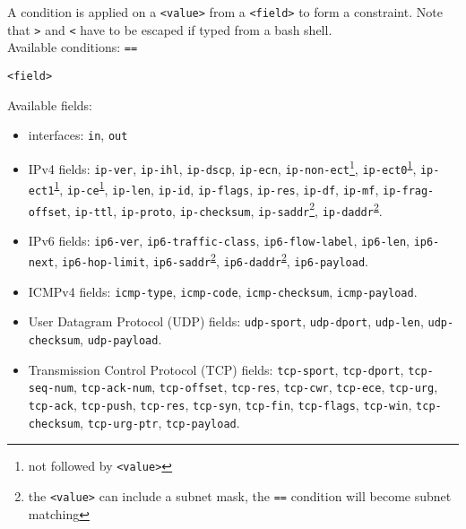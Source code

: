 \documentclass[a4paper,twoside,11pt]{report}
\makeatletter
\renewcommand{\subsection}{\@startsection{subsection}{2}{0mm}
  {\baselineskip}%
  {\baselineskip}{\Large\color{black}}}%
\makeatother
\begin{document}
A condition is applied on a \texttt{<value>} from a \texttt{<field>} to form
a constraint. Note that \texttt{>} and \texttt{<} have to be escaped if typed
from a bash shell.\\ 
Available conditions: \texttt{==}%

\subsection{\texttt{<field>}}

Available fields:
   \begin{itemize}
   \item interfaces: \texttt{in}, \texttt{out}

   \item IPv4 fields: \texttt{ip-ver}, \texttt{ip-ihl},  \texttt{ip-dscp}, 
     \texttt{ip-ecn}, \texttt{ip-non-ect}\footnote{\label{note-ecn}not followed 
     by \texttt{<value>}}, \texttt{ip-ect0}\textsuperscript{\ref{note-ecn}},
     \texttt{ip-ect1}\textsuperscript{\ref{note-ecn}}, 
     \texttt{ip-ce}\textsuperscript{\ref{note-ecn}}, \texttt{ip-len}, 
     \texttt{ip-id}, \texttt{ip-flags}, \texttt{ip-res}, \texttt{ip-df}, 
     \texttt{ip-mf}, \texttt{ip-frag-offset}, \texttt{ip-ttl}, \texttt{ip-proto}, 
     \texttt{ip-checksum}, \texttt{ip-saddr}\footnote{\label{note-prefix} the \texttt{<value>} 
     can include a subnet mask, the \texttt{==} condition will become subnet matching}, 
     \texttt{ip-daddr}\textsuperscript{\ref{note-prefix}}.

   \item IPv6 fields: \texttt{ip6-ver}, \texttt{ip6-traffic-class}, 
      \texttt{ip6-flow-label}, \texttt{ip6-len}, \texttt{ip6-next},  
      \texttt{ip6-hop-limit}, \texttt{ip6-saddr}\textsuperscript{\ref{note-prefix}}, 
      \texttt{ip6-daddr}\textsuperscript{\ref{note-prefix}}, \texttt{ip6-payload}.

   \item ICMPv4 fields: \texttt{icmp-type}, \texttt{icmp-code}, \texttt{icmp-checksum}, 
     \texttt{icmp-payload}.

   \item User Datagram Protocol (UDP) fields: \texttt{udp-sport}, \texttt{udp-dport}, \texttt{udp-len}, 
     \texttt{udp-checksum}, \texttt{udp-payload}.

   \item Transmission Control Protocol (TCP) fields: \texttt{tcp-sport}, \texttt{tcp-dport}, \texttt{tcp-seq-num}, 
      \texttt{tcp-ack-num}, \texttt{tcp-offset}, \texttt{tcp-res}, \texttt{tcp-cwr}, 
      \texttt{tcp-ece}, \texttt{tcp-urg}, \texttt{tcp-ack}, \texttt{tcp-push}, 
      \texttt{tcp-res}, \texttt{tcp-syn}, \texttt{tcp-fin}, \texttt{tcp-flags}, 
      \texttt{tcp-win}, \texttt{tcp-checksum}, \texttt{tcp-urg-ptr}, \texttt{tcp-payload}.


\end{itemize}
\end{document}
